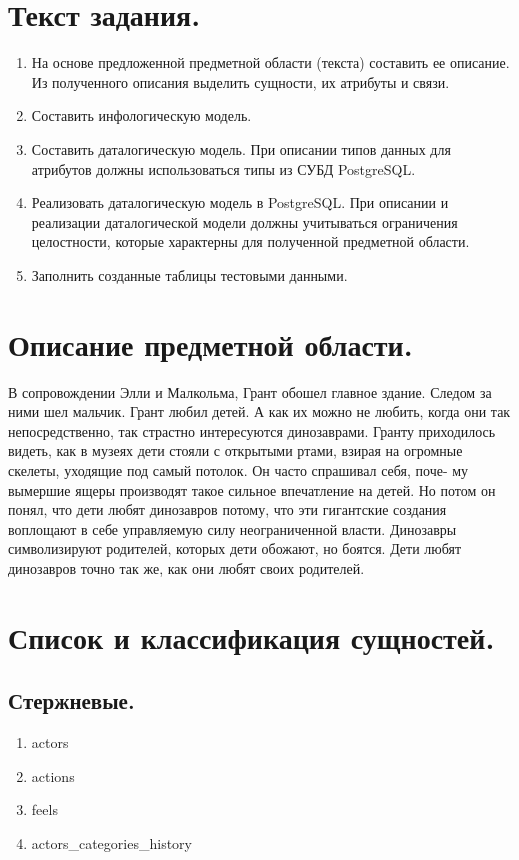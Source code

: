 
\vspace{3cm}
\tableofcontents

\newpage

\section{Текст задания.}
\begin{enumerate}
    \item На основе предложенной предметной области (текста) составить ее описание. Из полученного описания выделить сущности, их атрибуты и связи.
    \item Составить инфологическую модель.
    \item Составить даталогическую модель. При описании типов данных для атрибутов должны использоваться типы из СУБД PostgreSQL.
    \item Реализовать даталогическую модель в PostgreSQL. При описании и реализации даталогической модели должны учитываться ограничения целостности, которые характерны для полученной предметной области.
    \item Заполнить созданные таблицы тестовыми данными.
\end{enumerate}

\section{Описание предметной области.}
В сопровождении Элли и Малкольма, Грант обошел главное здание. Следом за ними шел мальчик. Грант любил детей. А как их
можно не любить, когда они так непосредственно, так страстно интересуются динозаврами. Гранту приходилось видеть, как в
музеях дети стояли с открытыми ртами, взирая на огромные скелеты, уходящие под самый потолок. Он часто спрашивал себя,
поче- му вымершие ящеры производят такое сильное впечатление на детей. Но потом он понял, что дети любят динозавров
потому, что эти гигантские создания воплощают в себе управляемую силу неограниченной власти. Динозавры символизируют
родителей, которых дети обожают, но боятся. Дети любят динозавров точно так же, как они любят своих родителей.

\section{Список и классификация сущностей.}

\subsection{Стержневые.}
\begin{enumerate}
    \item actors
    \item actions
    \item feels
    \item actors_categories_history
\end{enumerate}

